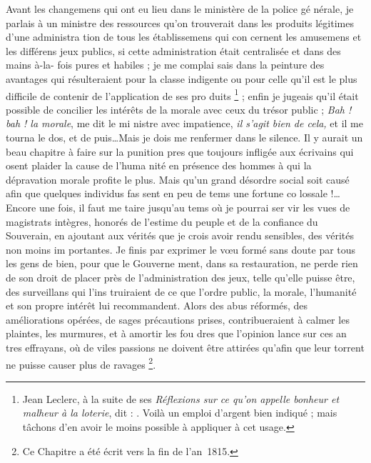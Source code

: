 Avant les changemens qui ont eu
lieu dans le ministère de la police gé%
nérale, je parlais à un ministre des
ressources qu'on trouverait dans les
produits légitimes d'une administra%
tion de tous les établissemens qui con%
cernent les amusemens et les différens
jeux publics, si cette administration
était centralisée et dans des mains à-la-%
fois pures et habiles ; je me complai%
sais dans la peinture des avantages qui
résulteraient pour la classe indigente
ou pour celle qu'il est le plus difficile
de contenir de l'application de ses pro%
duits
\footnote{Jean Leclerc, à la suite de ses \emph{Réflexions sur ce
  qu'on appelle bonheur et malheur à la loterie}, dit :
  .
  Voilà un emploi d'argent bien indiqué ; mais tâchons
  d'en avoir le moins possible à appliquer à cet usage.} ;
enfin je jugeais qu'il était
possible de concilier les intérêts de la
morale avec ceux du trésor public ;
\emph{Bah ! bah ! la morale}, me dit le mi%
nistre avec impatience, \emph{il s'agit bien
de cela,} et il me tourna le dos, et de%
puis\ldots Mais je dois me renfermer
dans le silence. Il y aurait un beau
chapitre à faire sur la punition pres%
que toujours infligée aux écrivains
qui osent plaider la cause de l'huma%
nité en présence des hommes à qui la
dépravation morale profite le plus.
Mais qu'un grand désordre social soit
causé afin que quelques individus fas%
sent en peu de tems une fortune co%
lossale !\ldots Encore une fois, il faut me
taire jusqu'au tems où je pourrai ser%
vir les vues de magistrats intègres,
honorés de l'estime du peuple et de la
confiance du Souverain, en ajoutant
aux vérités que je crois avoir rendu
sensibles, des vérités non moins im%
portantes. Je finis par exprimer le
vœu formé sans doute par tous les
gens de bien, pour que le Gouverne%
ment, dans sa restauration, ne perde
rien de son droit de placer près de
l'administration des jeux, telle qu'elle
puisse être, des surveillans qui l'ins%
truiraient de ce que l'ordre public,
la morale, l'humanité et son propre
intérêt lui recommandent. Alors des
abus réformés, des améliorations
opérées, de sages précautions prises,
contribueraient à calmer les plaintes,
les murmures, et à amortir les fou%
dres que l'opinion lance sur ces an%
tres effrayans, où de viles passions
ne doivent être attirées qu'afin que
leur torrent ne puisse causer plus de
ravages \footnote{
  Ce Chapitre a été écrit vers la fin de l'an~1815.
}.
